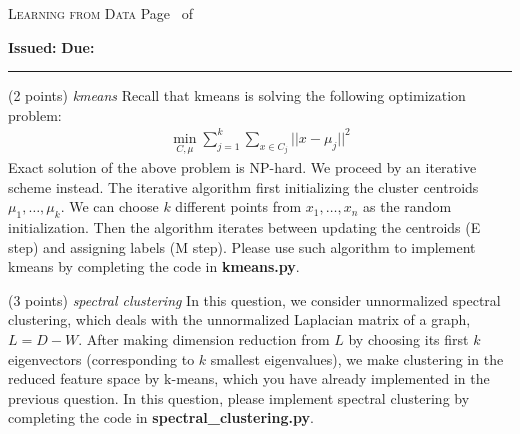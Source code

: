 \documentclass[a4paper, 12pt]{exam}
\newcommand{\firstblock}{programming_policies}
\begin{document}
	
	\pagestyle{headandfoot}
	\runningheadrule
	
	
	\setcounter{psctr}{3} %
	
	{\textsc{Learning from Data}}
	{ Page \thepage\ of \numpages}
	\firstpagefooter{}{}{}
	\runningfooter{}{}{}
	
	
	\newenvironment{Sequation}
	{\stepcounter{Sequ}%
		\addtocounter{equation}{-1}%
		\renewcommand\theequation{S\arabic{Sequ}}\equation}
	{\endequation}
	
	\centering
	
	\centering
	\renewcommand{\thequestion}{\arabic{psctr}.\arabic{question}}
	\courseheader
	\begin{flushleft}
		\textbf{Issued:}  \hfill
		\textbf{Due:}  
	\end{flushleft}
	
	\hrule 
	
	
	
	\vspace{1em}
	
	
	
	\begin{questions}

		\question (2 points) \emph{kmeans}
		Recall that kmeans is solving the following optimization
		problem:
		\begin{align*}
		    \min_{C, \mu} \sum_{j=1}^k \sum_{x \in C_j}
		    || x - \mu_j ||^2
		\end{align*}
		Exact solution of the above problem is NP-hard. We proceed
		by an iterative scheme instead. The iterative algorithm
		first initializing the cluster centroids $\mu_1, \dots, \mu_k$. We can choose $k$ different points from $x_1, \dots, x_n$ as the random initialization.
		Then the algorithm iterates between updating the centroids
		(E step) and assigning labels (M step).
		Please use such algorithm to implement kmeans by completing the code in \textbf{kmeans.py}.
		
		\question (3 points) \emph{spectral clustering}
		In this question, we consider unnormalized spectral clustering, which deals with the unnormalized Laplacian matrix of a graph, $L= D - W$. After making dimension reduction from $L$ by choosing its first $k$ eigenvectors
		(corresponding to $k$ smallest eigenvalues), we make clustering
		in the reduced feature space by k-means, which you have already implemented in the previous question. In this question, 
		please implement spectral clustering by completing the code in \textbf{spectral\_clustering.py}.
		
	\end{questions}
	
\end{document}
